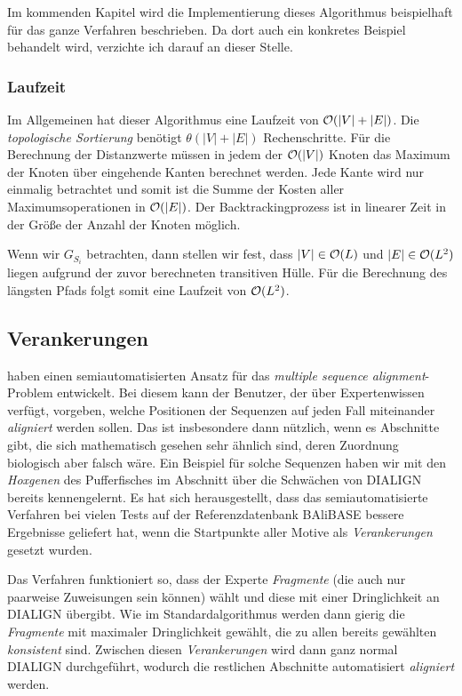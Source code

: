 Im kommenden Kapitel wird die Implementierung dieses Algorithmus beispielhaft für das ganze Verfahren beschrieben. Da dort auch ein konkretes Beispiel behandelt wird, verzichte ich darauf an dieser Stelle.

\subsubsection{Laufzeit}

Im Allgemeinen hat dieser Algorithmus eine Laufzeit von $\mathcal{O}(|V| + |E|)$. Die \emph{topologische Sortierung} benötigt $\theta(|V| + |E|)$ Rechenschritte. Für die Berechnung der Distanzwerte müssen in jedem der $\mathcal{O}(|V|)$ Knoten das Maximum der Knoten über eingehende Kanten berechnet werden. Jede Kante wird nur einmalig betrachtet und somit ist die Summe der Kosten aller Maximumsoperationen in $\mathcal{O}(|E|)$. Der Backtrackingprozess ist in linearer Zeit in der Größe der Anzahl der Knoten möglich.

Wenn wir $G_{S_i}$ betrachten, dann stellen wir fest, dass $|V| \in \mathcal{O}(L)$ und $|E| \in \mathcal{O}(L^2)$ liegen aufgrund der zuvor berechneten transitiven Hülle. Für die Berechnung des längsten Pfads folgt somit eine Laufzeit von $\mathcal{O}(L^2)$.

\subsection{Verankerungen}

\cite{mpps06} haben einen semiautomatisierten Ansatz für das \emph{multiple sequence alignment}-Problem entwickelt. Bei diesem kann der Benutzer, der über Expertenwissen verfügt, vorgeben, welche Positionen der Sequenzen auf jeden Fall miteinander \emph{aligniert} werden sollen. Das ist insbesondere dann nützlich, wenn es Abschnitte gibt, die sich mathematisch gesehen sehr ähnlich sind, deren Zuordnung biologisch aber falsch wäre. Ein Beispiel für solche Sequenzen haben wir mit den \emph{Hoxgenen} des Pufferfisches im Abschnitt über die Schwächen von DIALIGN bereits kennengelernt. Es hat sich herausgestellt, dass das semiautomatisierte Verfahren bei vielen Tests auf der Referenzdatenbank BAliBASE bessere Ergebnisse geliefert hat, wenn die Startpunkte aller Motive als \emph{Verankerungen} gesetzt wurden.

Das Verfahren funktioniert so, dass der Experte \emph{Fragmente} (die auch nur paarweise Zuweisungen sein können) wählt und diese mit einer Dringlichkeit an DIALIGN übergibt. Wie im Standardalgorithmus werden dann gierig die \emph{Fragmente} mit maximaler Dringlichkeit gewählt, die zu allen bereits gewählten \emph{konsistent} sind. Zwischen diesen \emph{Verankerungen} wird dann ganz normal DIALIGN durchgeführt, wodurch die restlichen Abschnitte automatisiert \emph{aligniert} werden.

